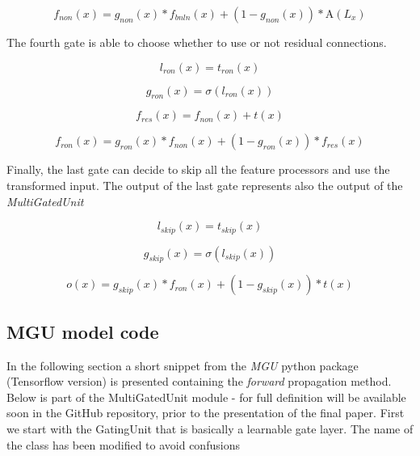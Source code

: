 \documentclass[11pt]{article}
\begin{document}
\begin{equation}
f_{non}(x) = g_{non}(x) * f_{bnln}(x) + (1-g_{non}(x)) * \text{A}(L_x)
\end{equation}

The fourth gate is able to choose whether to use or not residual
connections.

\begin{equation}
l_{ron}(x) = t_{ron}(x)
\end{equation}

\begin{equation}
g_{ron}(x) = \sigma(l_{ron}(x))
\end{equation}

\begin{equation}
 f_{res}(x) = f_{non}(x) + t(x)
\end{equation}

\begin{equation}
f_{ron}(x) = g_{ron}(x) * f_{non}(x) + (1-g_{ron}(x)) * f_{res}(x)
\end{equation}

Finally, the last gate can decide to skip all the feature processors and
use the transformed input. The output of the last gate represents also
the output of the \emph{MultiGatedUnit}

\begin{equation}
l_{skip}(x) = t_{skip}(x)
\end{equation}

\begin{equation}
g_{skip}(x) = \sigma(l_{skip}(x))
\end{equation}

\begin{equation}
o(x) = g_{skip}(x) * f_{ron}(x) + (1-g_{skip}(x)) * t(x)
\end{equation}

    \hypertarget{mgu-model-code}{%
\subsection{MGU model code}\label{mgu-model-code}}

In the following section a short snippet from the \emph{MGU} python
package (Tensorflow version) is presented containing the \emph{forward}
propagation method. Below is part of the MultiGatedUnit module - for
full definition will be available soon in the GitHub repository, prior
to the presentation of the final paper. First we start with the
GatingUnit that is basically a learnable gate layer. The name of the
class has been modified to avoid confusions
\end{document}
